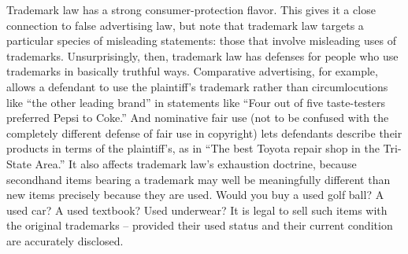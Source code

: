\item Trademark law has a strong consumer-protection flavor. This gives it a
close connection to false advertising law, but note that trademark law targets
a particular species of misleading statements: those that involve misleading
uses of trademarks. Unsurprisingly, then, trademark law has defenses for people
who use trademarks in basically truthful ways. Comparative advertising, for
example, allows a defendant to use the plaintiff's trademark rather than
circumlocutions like ``the other leading brand'' in statements like ``Four out
of five taste-testers preferred Pepsi to Coke.'' And nominative fair use (not
to be confused with the completely different defense of fair use in copyright)
lets defendants describe their products in terms of the plaintiff's, as in
``The best Toyota repair shop in the Tri-State Area.'' It also affects
trademark law's exhaustion doctrine, because secondhand items bearing a
trademark may well be meaningfully different than new items precisely because
they are used. Would you buy a used golf ball? A used car? A used textbook?
Used underwear? It is legal to sell such items with the original trademarks --
provided their used status and their current condition are accurately
disclosed.


